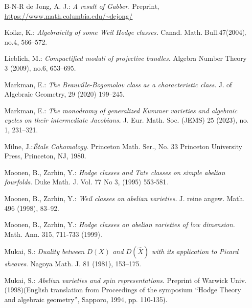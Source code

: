 \documentclass[12pt]{amsart}
\numberwithin{equation}{subsection}
\theoremstyle{plain}
\theoremstyle{definition}
\begin{document}
\begin{thebibliography}{B-N-R}
 de Jong, A. J.: {\em A result of Gabber.\/} Preprint, 
\url{https://www.math.columbia.edu/~dejong/}

 Koike, K.: {\em Algebraicity of some Weil Hodge classes.\/} Canad. Math. Bull.47(2004), no.4, 566--572.


 Lieblich, M.:
{\em Compactified moduli of projective bundles.\/} Algebra Number Theory 3 (2009), no.6, 653--695.

 Markman, E.:
{\em The Beauville-Bogomolov class as a characteristic class.\/}  J. of Algebraic Geometry, 29 (2020) 199--245.


  Markman, E.: {\em The monodromy of generalized Kummer varieties and algebraic cycles on their intermediate Jacobians.\/} J. Eur. Math. Soc. (JEMS) 25 (2023), no. 1, 231--321.


 Milne, J.:{\em \'{E}tale Cohomology.\/} Princeton Math. Ser., No. 33 Princeton University Press, Princeton, NJ, 1980.



 Moonen, B., Zarhin, Y.: {\em Hodge classes and Tate classes on simple abelian fourfolds.\/} Duke Math. J. Vol. 77 No 3, (1995) 553-581.

 Moonen, B., Zarhin, Y.: {\em Weil classes on abelian varieties.\/} J. reine angew. Math. 496 (1998), 83--92.

 Moonen, B., Zarhin, Y.: {\em Hodge classes on abelian varieties of low dimension.\/} Math. Ann. 315, 711-733 (1999).

 Mukai, S.:
{\em Duality between $D(X)$ and $D(\hat{X})$ with its application to Picard sheaves.\/} Nagoya Math. J. 81 (1981), 153--175.

 Mukai, S.: 
{\em Abelian varieties and spin representations.\/} Preprint of
Warwick Univ. (1998)(English translation from Proceedings of the symposium
``Hodge Theory and algebraic geometry'', Sapporo, 1994, pp. 110-135).


\end{thebibliography}
\end{document}
